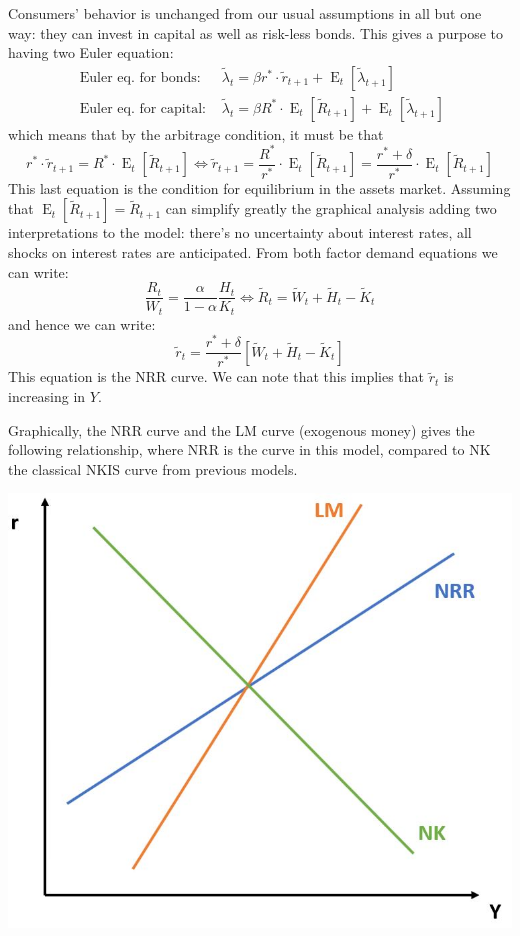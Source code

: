 \documentclass[12pt]{report}
\newcommand{\Et}[1]{\operatorname{E}_t\left[#1\right]}
\begin{document}
Consumers' behavior is unchanged from our usual assumptions in all but one way: they can invest in capital as well as risk-less bonds. This gives a purpose to having two Euler equation: \begin{align*} 
\text{ Euler eq. for bonds: } & \tilde \lambda_{t} =  \beta r^*\cdot \tilde r_{t+1} + \Et{\tilde\lambda_{t+1}} \\ 
\text{ Euler eq. for capital: } & \tilde \lambda_{t} =  \beta R^*\cdot \Et{\tilde R_{t+1}} + \Et{\tilde\lambda_{t+1}}
\end{align*} which means that by the arbitrage condition, it must be that $$r^*\cdot \tilde r_{t+1} = R^*\cdot \Et{\tilde R_{t+1}} \Leftrightarrow \tilde r_{t+1} = \frac{R^*}{r^*} \cdot \Et{\tilde R_{t+1}} = \frac{r^* + \delta}{r^*} \cdot \Et{\tilde R_{t+1}} $$ This last equation is the condition for equilibrium in the assets market. Assuming that $\Et{\tilde R_{t+1}} = \tilde R_{t+1}$ can simplify greatly the graphical analysis adding two interpretations to the model: there's no uncertainty about interest rates, all shocks on interest rates are anticipated. From both factor demand equations we can write: $$\frac{R_t}{W_t} = \frac{\alpha}{1 - \alpha}\frac{H_t}{K_t} \Leftrightarrow \tilde R_t = \tilde W_t + \tilde H_t - \tilde K_t $$ and hence we can write: $$\tilde r_t = \frac{r^* + \delta}{r^*} [\tilde W_t + \tilde H_t - \tilde K_t] $$ This equation is the NRR curve. We can note that this implies that $\tilde r_t$ is increasing in $Y$.

\begin{minipage}{0.34\textwidth}
Graphically, the NRR curve and the LM curve (exogenous money) gives the following relationship, where NRR is the curve in this model, compared to NK the classical NKIS curve from previous models.
\end{minipage}
\begin{minipage}{0.64\textwidth}
\centering
\includegraphics[scale=0.35]{images/graphDNKK}
\end{minipage} \hfill
\end{document}
